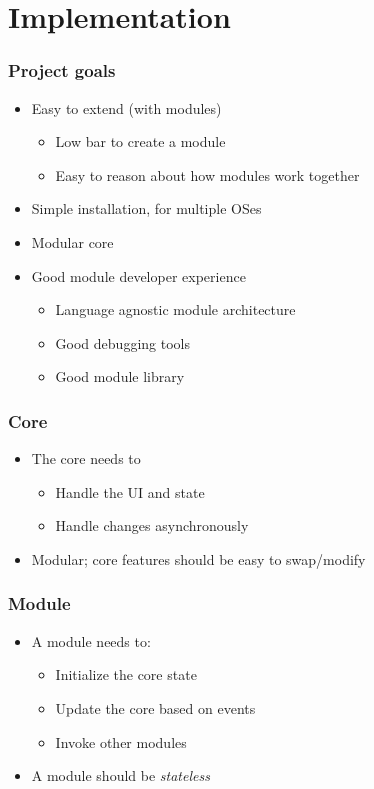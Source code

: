 \section{Implementation}
\SectionPage

\begin{frame}
  \frametitle{Project goals}
  \begin{itemize}
    \item Easy to extend (with modules)
      \begin{itemize}
        \item Low bar to create a module
        \item Easy to reason about how modules work together
      \end{itemize}
    \item Simple installation, for multiple OSes
    \item Modular core
    \item Good module developer experience
      \begin{itemize}
        \item Language agnostic module architecture
        \item Good debugging tools
        \item Good module library
      \end{itemize}
  \end{itemize}
\end{frame}

\begin{frame}
  \frametitle{Core}
  \begin{itemize}
    \item The core needs to
      \begin{itemize}
        \item Handle the UI and state
        \item Handle changes asynchronously
      \end{itemize}
    \item Modular; core features should be easy to swap/modify
  \end{itemize}
\end{frame}

\begin{frame}
  \frametitle{Module}
  \begin{itemize}
    \item A module needs to:
      \begin{itemize}
        \item Initialize the core state
        \item Update the core based on events
        \item Invoke other modules
      \end{itemize}
    \item A module should be \textit{stateless}
  \end{itemize}
\end{frame}

